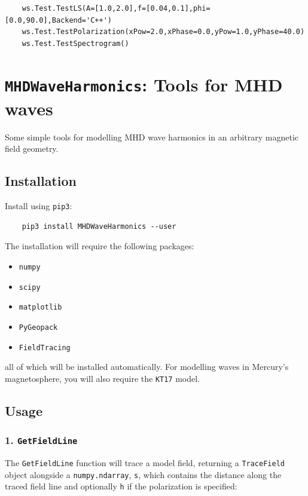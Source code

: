 	\begin{verbatim}
	ws.Test.TestLS(A=[1.0,2.0],f=[0.04,0.1],phi=[0.0,90.0],Backend='C++')
	ws.Test.TestPolarization(xPow=2.0,xPhase=0.0,yPow=1.0,yPhase=40.0)
	ws.Test.TestSpectrogram()
	\end{verbatim}
	

	\section{\texttt{MHDWaveHarmonics}: Tools for MHD waves}
	
	Some simple tools for modelling MHD wave harmonics in an arbitrary magnetic field geometry.
	
	\subsection{Installation}
	
	Install using \texttt{pip3}:
	
	\begin{verbatim}
	pip3 install MHDWaveHarmonics --user
	\end{verbatim}
	
	The installation will require the following packages:
	
	\begin{itemize}
	  \item \texttt{numpy}
	  \item \texttt{scipy}
	  \item \texttt{matplotlib}
	  \item \texttt{PyGeopack}
	  \item \texttt{FieldTracing}
	\end{itemize}
	
	all of which will be installed automatically. For modelling waves in
	Mercury's magnetosphere, you will also require the \texttt{KT17} model.
	
	\subsection{Usage}
	
	\subsubsection{1. \texttt{GetFieldLine}}
	
	The \texttt{GetFieldLine} function will trace a model field, returning a 
	\texttt{TraceField} object alongside a \texttt{numpy.ndarray}, \texttt{s}, which contains the 
	distance along the traced field line and optionally \texttt{h} if the 
	polarization is specified:
	
